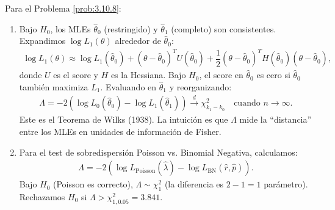 \begin{solucion}
	\label{sol:3.10.8}
	Para el Problema \ref{prob:3.10.8}:
	\begin{enumerate}
		\item Bajo $H_{0}$, los MLEs $\hat{\theta}_{0}$ (restringido) y $\hat{\theta}_{1}$ (completo) son consistentes. Expandimos $\log L_{1}(\theta)$ alrededor de $\hat{\theta}_{0}$:
		\begin{align*}
			\log L_{1}(\theta) \approx \log L_{1}(\hat{\theta}_{0}) + (\theta - \hat{\theta}_{0})^{T} U(\hat{\theta}_{0}) + \dfrac{1}{2}(\theta - \hat{\theta}_{0})^{T} H(\hat{\theta}_{0}) (\theta - \hat{\theta}_{0}),
		\end{align*}
		donde $U$ es el score y $H$ es la Hessiana. Bajo $H_{0}$, el score en $\hat{\theta}_{0}$ es cero si $\hat{\theta}_{0}$ también maximiza $L_{1}$. Evaluando en $\hat{\theta}_{1}$ y reorganizando:
		\begin{align*}
			\Lambda = -2(\log L_{0}(\hat{\theta}_{0}) - \log L_{1}(\hat{\theta}_{1})) \xrightarrow{d} \chi^{2}_{k_{1} - k_{0}} \quad \text{cuando } n \to \infty.
		\end{align*}
		Este es el Teorema de Wilks (1938). La intuición es que $\Lambda$ mide la ``distancia'' entre los MLEs en unidades de información de Fisher.
		\item Para el test de sobredispersión Poisson vs. Binomial Negativa, calculamos:
		\begin{align*}
			\Lambda = -2(\log L_{\text{Poisson}}(\hat{\lambda}) - \log L_{\text{BN}}(\hat{r}, \hat{p})).
		\end{align*}
		Bajo $H_{0}$ (Poisson es correcto), $\Lambda \sim \chi^{2}_{1}$ (la diferencia es $2 - 1 = 1$ parámetro). Rechazamos $H_{0}$ si $\Lambda > \chi^{2}_{1, 0.05} = 3.841$.
	\end{enumerate}
\end{solucion}

